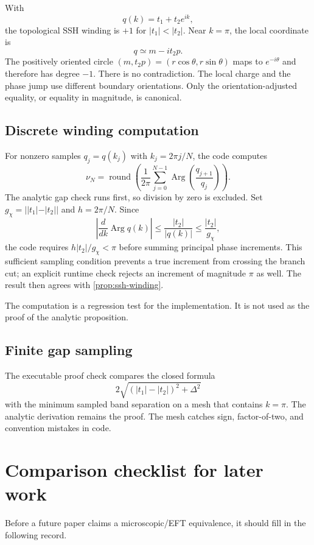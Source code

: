 \documentclass[12pt]{article}
\theoremstyle{definition}
\theoremstyle{remark}
\begin{document}
With
\[
q(k)=t_1+t_2e^{ik},
\]
the topological SSH winding is $+1$ for $|t_1|<|t_2|$.
Near $k=\pi$, the local coordinate is
\[
q\simeq m-it_2p.
\]
The positively oriented circle $(m,t_2p)=(r\cos\theta,r\sin\theta)$ maps to
$e^{-i\theta}$ and therefore has degree $-1$.
There is no contradiction.
The local charge and the phase jump use different boundary orientations.
Only the orientation-adjusted equality, or equality in magnitude, is
canonical.

\subsection{Discrete winding computation}

For nonzero samples $q_j=q(k_j)$ with
$k_j=2\pi j/N$, the code computes
\[
\nu_N
=
\operatorname{round}
\left(
\frac{1}{2\pi}
\sum_{j=0}^{N-1}
\operatorname{Arg}
\left(\frac{q_{j+1}}{q_j}\right)
\right).
\]
The analytic gap check runs first, so division by zero is excluded.
Set $g_\chi=||t_1|-|t_2||$ and $h=2\pi/N$.
Since
\[
\left|\frac{d}{dk}\operatorname{Arg}q(k)\right|
\leq \frac{|t_2|}{|q(k)|}
\leq \frac{|t_2|}{g_\chi},
\]
the code requires $h|t_2|/g_\chi<\pi$ before summing principal phase
increments.
This sufficient sampling condition prevents a true increment from crossing
the branch cut; an explicit runtime check rejects an increment of magnitude
$\pi$ as well.
The result then agrees with \cref{prop:ssh-winding}.

The computation is a regression test for the implementation.
It is not used as the proof of the analytic proposition.

\subsection{Finite gap sampling}

The executable proof check compares the closed formula
\[
2\sqrt{(|t_1|-|t_2|)^2+\Delta^2}
\]
with the minimum sampled band separation on a mesh that contains $k=\pi$.
The analytic derivation remains the proof.
The mesh catches sign, factor-of-two, and convention mistakes in code.

\section{Comparison checklist for later work}

Before a future paper claims a microscopic/EFT equivalence, it should fill in
the following record.
\end{document}

